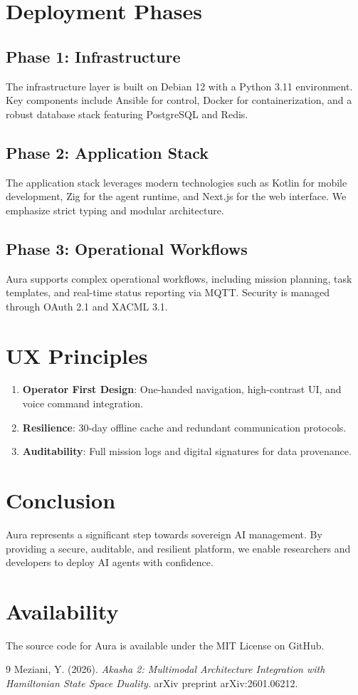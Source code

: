 \documentclass[11pt,a4paper]{article}
\begin{document}
\section{Deployment Phases}

\subsection{Phase 1: Infrastructure}
The infrastructure layer is built on Debian 12 with a Python 3.11 environment. Key components include Ansible for control, Docker for containerization, and a robust database stack featuring PostgreSQL and Redis.

\subsection{Phase 2: Application Stack}
The application stack leverages modern technologies such as Kotlin for mobile development, Zig for the agent runtime, and Next.js for the web interface. We emphasize strict typing and modular architecture.

\subsection{Phase 3: Operational Workflows}
Aura supports complex operational workflows, including mission planning, task templates, and real-time status reporting via MQTT. Security is managed through OAuth 2.1 and XACML 3.1.

\section{UX Principles}
\begin{enumerate}
    \item \textbf{Operator First Design}: One-handed navigation, high-contrast UI, and voice command integration.
    \item \textbf{Resilience}: 30-day offline cache and redundant communication protocols.
    \item \textbf{Auditability}: Full mission logs and digital signatures for data provenance.
\end{enumerate}

\section{Conclusion}
Aura represents a significant step towards sovereign AI management. By providing a secure, auditable, and resilient platform, we enable researchers and developers to deploy AI agents with confidence.

\section*{Availability}
The source code for Aura is available under the MIT License on GitHub.

\begin{thebibliography}{9}
Meziani, Y. (2026). \textit{Akasha 2: Multimodal Architecture Integration with Hamiltonian State Space Duality}. arXiv preprint arXiv:2601.06212.
\end{thebibliography}
\end{document}
